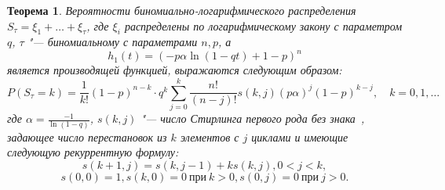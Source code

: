 \documentclass[12pt, specialist, subf, substylefile = spbu.rtx]{disser}
\newtheorem{theorem}{Теорема}
\begin{document}
	\begin{theorem}
		Вероятности биномиально-логарифмического распределения $S _\tau = \xi _1 + \dots + \xi _\tau$, где $\xi _i$ распределены по логарифмическому закону с параметром $q$, $\tau$ "--- биномиальному с параметрами $n, p$, а
		\[
			h _1(t) = \left(-p \alpha \ln (1 - qt) + 1 - p\right) ^n
		\]
		является производящей функцией, выражаются следующим образом:
		\label{theorem:probBLR}
		\begin{equation} \label{eq:probBLR}
			P(S _\tau = k) = \frac 1 {k!} (1 - p) ^{n - k} \cdot q ^k \sum \limits ^{k} _{j = 0} \frac {n!} {(n - j)!} s(k, j) (p \alpha) ^j (1 - p) ^{k - j},\quad k = 0, 1, \dots
		\end{equation}
		где $ \alpha = \frac {-1} {\ln(1 - q)} $, $ s(k, j) $ "--- число Стирлинга первого рода без знака~\cite{bib:knuth1998}, задающее число перестановок из $ k $ элементов с $ j $ циклами и имеющие следующую рекуррентную формулу:
		\[
			s(k + 1, j) = s(k, j - 1) + k s(k, j), 0 < j < k,
		\]
		\[
			s(0, 0) = 1, s(k, 0) = 0~\text{при}~ k > 0, s(0, j) = 0~\text{при}~ j > 0.
		\]
	\end{theorem}
\end{document}
